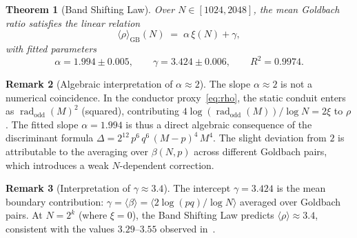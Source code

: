 \documentclass[11pt,a4paper]{article}
\newtheorem{theorem}{Theorem}[section]
\theoremstyle{definition}
\newtheorem{remark}[theorem]{Remark}
\DeclareMathOperator{\rad}{rad}
\begin{document}
\begin{theorem}[Band Shifting Law]\label{thm:BSL}
  Over $N \in [1024, 2048]$, the mean Goldbach ratio satisfies the linear relation
  \begin{equation}\label{eq:BSL}
    \langle\rho\rangle_{\mathrm{GB}}(N) \;=\; \alpha\,\xi(N) + \gamma,
  \end{equation}
  with fitted parameters
  \begin{equation}\label{eq:params}
    \alpha = 1.994 \pm 0.005, \qquad \gamma = 3.424 \pm 0.006,
    \qquad R^2 = 0.9974.
  \end{equation}
\end{theorem}

\begin{remark}[Algebraic interpretation of $\alpha \approx 2$]\label{rem:alpha}
  The slope $\alpha \approx 2$ is not a numerical coincidence.  In the conductor
  proxy~\eqref{eq:rho}, the static conduit enters as $\rad_{\mathrm{odd}}(M)^2$
  (squared), contributing $4\log(\rad_{\mathrm{odd}}(M))/\log N = 2\xi$ to $\rho$.
  The fitted slope $\alpha = 1.994$ is thus a direct algebraic consequence of the
  discriminant formula $\Delta = 2^{12}\,p^6\,q^6\,(M-p)^4\,M^4$.
  The slight deviation from $2$ is attributable to the averaging over $\beta(N,p)$
  across different Goldbach pairs, which introduces a weak $N$-dependent correction.
\end{remark}

\begin{remark}[Interpretation of $\gamma \approx 3.4$]\label{rem:gamma}
  The intercept $\gamma = 3.424$ is the mean boundary contribution:
  $\gamma = \langle\beta\rangle = \langle 2\log(pq)/\log N \rangle$ averaged
  over Goldbach pairs.  At $N = 2^k$ (where $\xi = 0$), the Band Shifting Law
  predicts $\langle\rho\rangle \approx 3.4$, consistent with the values
  $3.29$--$3.55$ observed in~\cite{Chen2026AV}.
\end{remark}
\end{document}
